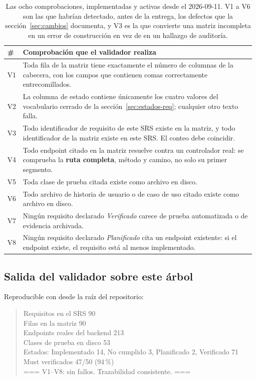 \documentclass[11pt,a4paper]{article}
\DeclareRobustCommand{\cd}[1]{\texttt{\protect\seqsplit{#1}}}
\begin{document}
\begin{table}[H]\centering\small
\begin{tabular}{p{0.8cm} p{13.9cm}}
\toprule
\textbf{\#} & \textbf{Comprobación que el validador realiza} \\
\midrule
V1 & Toda fila de la matriz tiene exactamente el número de columnas de la cabecera, con los
campos que contienen comas correctamente entrecomillados. \\
V2 & La columna de estado contiene únicamente los cuatro valores del vocabulario cerrado de la
sección~\ref{sec:estados-req}; cualquier otro texto falla. \\
V3 & Todo identificador de requisito de este SRS existe en la matriz, y todo identificador de la
matriz existe en este SRS. El conteo debe coincidir. \\
V4 & Todo endpoint citado en la matriz resuelve contra un controlador real: se comprueba la
\textbf{ruta completa}, método y camino, no solo su primer segmento. \\
V5 & Toda clase de prueba citada existe como archivo en disco. \\
V6 & Todo archivo de historia de usuario o de caso de uso citado existe como archivo en disco. \\
V7 & Ningún requisito declarado \emph{Verificado} carece de prueba automatizada o de evidencia
archivada. \\
V8 & Ningún requisito declarado \emph{Planificado} cita un endpoint existente: si el endpoint
existe, el requisito está al menos implementado. \\
\bottomrule
\end{tabular}
\caption{Las ocho comprobaciones, implementadas y activas desde el 2026-09-11. V1 a V6 son las
que habrían detectado, antes de la entrega, los defectos que la sección~\ref{sec:cambios}
documenta, y V3 es la que convierte una matriz incompleta en un error de construcción en vez de
en un hallazgo de auditoría.}
\end{table}

\subsection{Salida del validador sobre este árbol}
\label{sec:salida-validador}

Reproducible con \cd{./scripts/validate-traceability.sh} desde la raíz del repositorio:

\begin{quote}\ttfamily\small\noindent
Requisitos en el SRS \dotfill{} 90\\
Filas en la matriz \dotfill{} 90\\
Endpoints reales del backend \dotfill{} 213\\
Clases de prueba en disco \dotfill{} 53\\
Estados: Implementado 14, No cumplido 3, Planificado 2, Verificado 71\\
Must verificados \dotfill{} 47/50 (94\,\%)\\
=== V1--V8: sin fallos. Trazabilidad consistente. ===
\end{quote}
\end{document}
